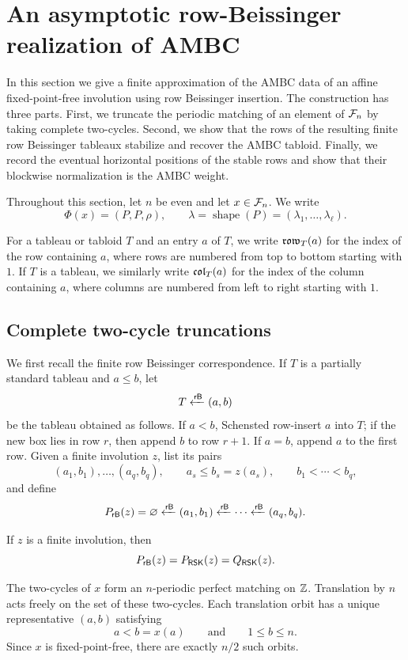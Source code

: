 \documentclass[11pt]{article}
\begin{document}
\section{An asymptotic row-Beissinger realization of AMBC}\label{sec:affine-rb}

In this section we give a finite approximation of the AMBC data of an
affine fixed-point-free involution using row Beissinger insertion.  The
construction has three parts.  First, we truncate the periodic matching of
an element of $\mathcal F_n$ by taking complete two-cycles.  Second, we show that
the rows of the resulting finite row Beissinger tableaux stabilize and
recover the AMBC tabloid.  Finally, we record the eventual horizontal
positions of the stable rows and show that their blockwise normalization is
the AMBC weight.

Throughout this section, let $n$ be even and let $x\in\mathcal F_n$.  We write
\[
\Phi(x)=(P,P,\rho),
\qquad
\lambda=\operatorname{shape}(P)
      =(\lambda_1,\ldots,\lambda_{\ell}).
\]

For a tableau or tabloid $T$ and an entry $a$ of $T$, we write $\mathfrak{row}_T(a)$ for the index of the row containing $a$, where rows are numbered
from top to bottom starting with $1$.  If $T$ is a tableau, we similarly write $\mathfrak{col}_T(a)$ for the index of the column containing $a$, where columns are
numbered from left to right starting with $1$.

\subsection{Complete two-cycle truncations}

We first recall the finite row Beissinger correspondence.  If $T$ is a
partially standard tableau and $a\leq b$, let
\[
T\xleftarrow{\mathsf{rB}}(a,b)
\]
be the tableau obtained as follows.  If $a<b$, Schensted row-insert $a$
into $T$; if the new box lies in row $r$, then append $b$ to row $r+1$.
If $a=b$, append $a$ to the first row.  Given a finite involution $z$, list
its pairs
\[
(a_1,b_1),\ldots,(a_q,b_q),
\qquad
 a_s\leq b_s=z(a_s),
\qquad
 b_1<\cdots<b_q,
\]
and define
\[
P_{\mathsf{rB}}(z)
=
\varnothing
\xleftarrow{\mathsf{rB}}(a_1,b_1)
\xleftarrow{\mathsf{rB}}\cdots
\xleftarrow{\mathsf{rB}}(a_q,b_q).
\]

\begin{theorem}
\label{finite-rb-thm}
If $z$ is a finite involution, then
\[
P_{\mathsf{rB}}(z)=P_{\mathsf{RSK}}(z)=Q_{\mathsf{RSK}}(z).
\]
\end{theorem}

The two-cycles of $x$ form an $n$-periodic perfect matching on $\mathbb{Z}$.
Translation by $n$ acts freely on the set of these two-cycles.  Each
translation orbit has a unique representative $(a,b)$ satisfying
\[
a<b=x(a)
\qquad\text{and}\qquad
1\leq b\leq n.
\]
Since $x$ is fixed-point-free, there are exactly $n/2$ such orbits.
\end{document}
